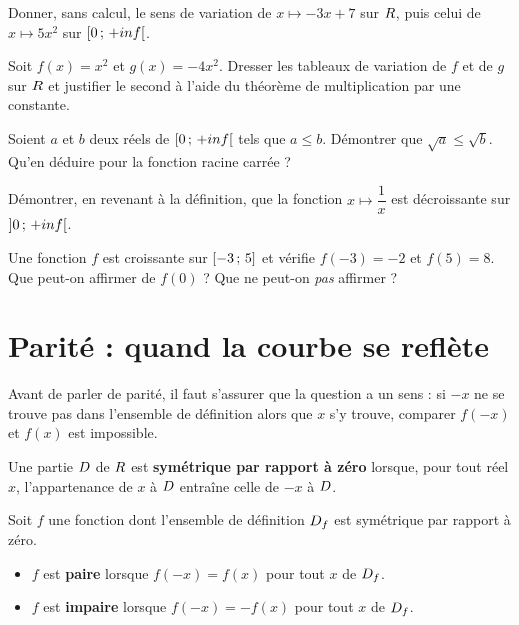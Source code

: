 \begin{entrainement}
\exo\label{t11s-c01-e13} Donner, sans calcul, le sens de variation de $x \mapsto -3x + 7$ sur
$R$, puis celui de $x \mapsto 5x^{2}$ sur $\left[0\,;\,+inf\right[$.

\exo\label{t11s-c01-e14} Soit $f(x) = x^{2}$ et $g(x) = -4x^{2}$. Dresser les tableaux de
variation de $f$ et de $g$ sur $R$ et justifier le second à l'aide du
théorème de multiplication par une constante.

\exo\label{t11s-c01-e15} Soient $a$ et $b$ deux réels de $\left[0\,;\,+inf\right[$ tels que
$a \leq b$. Démontrer que $\sqrt{a} \leq \sqrt{b}$. Qu'en déduire pour la
fonction racine carrée ?

\exo\label{t11s-c01-e16} Démontrer, en revenant à la définition, que la fonction
$x \mapsto \dfrac{1}{x}$ est décroissante sur $\left]0\,;\,+inf\right[$.

\exo\label{t11s-c01-e17} Une fonction $f$ est croissante sur $\left[-3\,;\,5\right]$ et vérifie
$f(-3) = -2$ et $f(5) = 8$. Que peut-on affirmer de $f(0)$ ? Que ne peut-on
\emph{pas} affirmer ?
\end{entrainement}

\section{Parité : quand la courbe se reflète}

Avant de parler de parité, il faut s'assurer que la question a un sens : si
$-x$ ne se trouve pas dans l'ensemble de définition alors que $x$ s'y trouve,
comparer $f(-x)$ et $f(x)$ est impossible.

\begin{definition}
Une partie $D$ de $R$ est \textbf{symétrique par rapport à zéro} lorsque,
pour tout réel $x$, l'appartenance de $x$ à $D$ entraîne celle de $-x$ à
$D$.
\end{definition}

\begin{definition}
Soit $f$ une fonction dont l'ensemble de définition $D_{f}$ est symétrique
par rapport à zéro.
\begin{itemize}[leftmargin=1.6em, itemsep=0.2em]
  \item $f$ est \textbf{paire} lorsque $f(-x) = f(x)$ pour tout $x$ de
        $D_{f}$.
  \item $f$ est \textbf{impaire} lorsque $f(-x) = -f(x)$ pour tout $x$ de
        $D_{f}$.
\end{itemize}
\end{definition}

